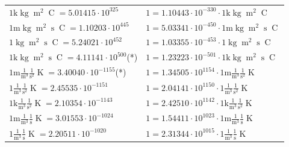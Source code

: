 \begin{center}
\begin{longtable}{l l}
{\color{gray}$1 \bm{\mathrm{ k}}\operatorname{kg}{\operatorname{m}^2}{}{\operatorname{C}}{} = 5.01415\cdot10^{325} $}   & {\color{gray}$ 1 = 1.10443\cdot10^{-330} \cdot 1 \bm{\mathrm{ k}}\operatorname{kg}{\operatorname{m}^2}{}{\operatorname{C}}{}$}  \\
{\color{gray}$1 \bm{\mathrm{ m}}\operatorname{kg}{\operatorname{m}^2}{\operatorname{s}}{\operatorname{C}}{} = 1.10203\cdot10^{445} $}   & {\color{gray}$ 1 = 5.03341\cdot10^{-450} \cdot 1 \bm{\mathrm{ m}}\operatorname{kg}{\operatorname{m}^2}{\operatorname{s}}{\operatorname{C}}{}$}  \\
{\color{black}$1 \bm{\mathrm{ }}\operatorname{kg}{\operatorname{m}^2}{\operatorname{s}}{\operatorname{C}}{} = 5.24021\cdot10^{452} $}   & {\color{black}$ 1 = 1.03355\cdot10^{-453} \cdot 1 \bm{\mathrm{ }}\operatorname{kg}{\operatorname{m}^2}{\operatorname{s}}{\operatorname{C}}{}$}  \\
{\color{gray}$1 \bm{\mathrm{ k}}\operatorname{kg}{\operatorname{m}^2}{\operatorname{s}}{\operatorname{C}}{} = 4.11141\cdot10^{500} $}\quad(*) & {\color{gray}$ 1 = 1.23223\cdot10^{-501} \cdot 1 \bm{\mathrm{ k}}\operatorname{kg}{\operatorname{m}^2}{\operatorname{s}}{\operatorname{C}}{}$}  \\
\hline{\color{gray}$1 \bm{\mathrm{ m}}\frac1{\operatorname{m}^3}\frac1{\operatorname{s}^2}{}{\operatorname{K}} = 3.40040\cdot10^{-1155} $}\quad(*) & {\color{gray}$ 1 = 1.34505\cdot10^{1154} \cdot 1 \bm{\mathrm{ m}}\frac1{\operatorname{m}^3}\frac1{\operatorname{s}^2}{}{\operatorname{K}}$}  \\
{\color{black}$1 \bm{\mathrm{ }}\frac1{\operatorname{m}^3}\frac1{\operatorname{s}^2}{}{\operatorname{K}} = 2.45535\cdot10^{-1151} $}   & {\color{black}$ 1 = 2.04141\cdot10^{1150} \cdot 1 \bm{\mathrm{ }}\frac1{\operatorname{m}^3}\frac1{\operatorname{s}^2}{}{\operatorname{K}}$}  \\
{\color{gray}$1 \bm{\mathrm{ k}}\frac1{\operatorname{m}^3}\frac1{\operatorname{s}^2}{}{\operatorname{K}} = 2.10354\cdot10^{-1143} $}   & {\color{gray}$ 1 = 2.42510\cdot10^{1142} \cdot 1 \bm{\mathrm{ k}}\frac1{\operatorname{m}^3}\frac1{\operatorname{s}^2}{}{\operatorname{K}}$}  \\
{\color{gray}$1 \bm{\mathrm{ m}}\frac1{\operatorname{m}^3}\frac1{\operatorname{s}}{}{\operatorname{K}} = 3.01553\cdot10^{-1024} $}   & {\color{gray}$ 1 = 1.54411\cdot10^{1023} \cdot 1 \bm{\mathrm{ m}}\frac1{\operatorname{m}^3}\frac1{\operatorname{s}}{}{\operatorname{K}}$}  \\
{\color{black}$1 \bm{\mathrm{ }}\frac1{\operatorname{m}^3}\frac1{\operatorname{s}}{}{\operatorname{K}} = 2.20511\cdot10^{-1020} $}   & {\color{black}$ 1 = 2.31344\cdot10^{1015} \cdot 1 \bm{\mathrm{ }}\frac1{\operatorname{m}^3}\frac1{\operatorname{s}}{}{\operatorname{K}}$}  \\

\end{longtable}
\end{center}
